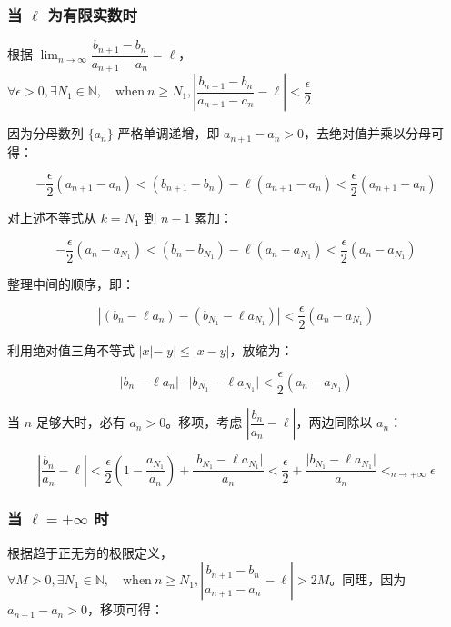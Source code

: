 \subsubsection{当 $\displaystyle \ell$ 为有限实数时}

根据 $\displaystyle\lim_{n \to \infty} \displaystyle\dfrac{b_{n+1} - b_n}{a_{n+1} - a_n} = \ell$，$\forall \epsilon > 0,\exists N_{1}\in\mathbb{N} ,\quad \text{when} \ n \ge N_1,\displaystyle \left\vert \dfrac{b_{n+1} - b_n}{a_{n+1} - a_n} - \ell \right\vert < \dfrac{\epsilon}{2}$

因为分母数列 $\displaystyle \lbrace a_n \rbrace$ 严格单调递增，即 $\displaystyle a_{n+1} - a_n > 0$，去绝对值并乘以分母可得：

$$
\displaystyle -\dfrac{\epsilon}{2}(a_{n+1} - a_n) < (b_{n+1} - b_n) - \ell(a_{n+1} - a_n) < \dfrac{\epsilon}{2}(a_{n+1} - a_n)
$$

对上述不等式从 $\displaystyle k = N_1$ 到 $\displaystyle n-1$ 累加：

$$
\displaystyle -\dfrac{\epsilon}{2} (a_n - a_{N_1}) < (b_n - b_{N_1}) - \ell(a_n - a_{N_1}) < \dfrac{\epsilon}{2} (a_n - a_{N_1})
$$

整理中间的顺序，即：

$$
\displaystyle \left\vert (b_n - \ell a_n) - (b_{N_1} - \ell a_{N_1}) \right\vert < \dfrac{\epsilon}{2} (a_n - a_{N_1})
$$

利用绝对值三角不等式 $\displaystyle \vert x \vert - \vert y \vert \le \vert x - y \vert$，放缩为：

$$
\displaystyle \vert b_n - \ell a_n \vert-\vert b_{N_1} - \ell a_{N_1} \vert < \dfrac{\epsilon}{2} (a_n - a_{N_1})
$$

当 $\displaystyle n$ 足够大时，必有 $\displaystyle a_n > 0$。移项，考虑 $\left\vert \dfrac{b_n}{a_n} - \ell \right\vert$，两边同除以 $\displaystyle a_n$：

$$
\displaystyle \left\vert \dfrac{b_n}{a_n} - \ell \right\vert < \dfrac{\epsilon}{2} \left( 1 - \dfrac{a_{N_1}}{a_n} \right) + \dfrac{\vert b_{N_1} - \ell a_{N_1} \vert}{a_n} < \dfrac{\epsilon}{2} + \dfrac{\vert b_{N_1} - \ell a_{N_1} \vert}{a_n}<_{n \to+\infty}\epsilon
$$





\subsubsection{当 $\displaystyle \ell = +\infty$ 时}

根据趋于正无穷的极限定义，$\forall M> 0,\exists N_{1}\in\mathbb{N} ,\quad \text{when} \ n \ge N_1,\displaystyle \left\vert \dfrac{b_{n+1} - b_n}{a_{n+1} - a_n} - \ell \right\vert >2M$。同理，因为 $\displaystyle a_{n+1} - a_n > 0$，移项可得：

